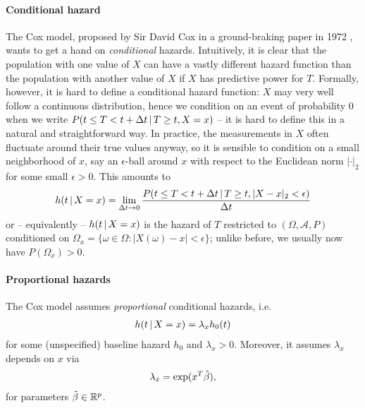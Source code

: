 \paragraph{Conditional hazard}
The Cox model, proposed by Sir David Cox in a ground-braking paper in \num{1972} \cite{cox72}, wants 
to get a hand on \textit{conditional} hazards.
Intuitively, it is clear that the population with one value of $X$ can have a vastly different 
hazard function than the population with another value of $X$ if $X$ has predictive power for $T$.
Formally, however, it is hard to define a conditional hazard function: $X$ may very well 
follow a continuous distribution, hence we condition on an event of probability $0$ when we write 
$P(t \leq T < t + \Delta t \,|\, T \geq t, X = x)$ -- it is hard to define this in a natural
and straightforward way. In practice, the measurements in $X$ often fluctuate around their true 
values anyway, so it is sensible to condition on a small neighborhood of $x$, say an $\epsilon$-ball 
around $x$ with respect to the Euclidean norm $|\cdot|_2$ for some small $\epsilon > 0$. This 
amounts to
\begin{align}
    h(t \,|\, X = x) = \lim_{\Delta t \to 0} \frac{P(t \leq T < t + \Delta t \,|\, T \geq t, 
    |X - x|_2 < \epsilon)}{\Delta t}
\end{align}
or -- equivalently -- $h(t \,|\, X = x)$ is the hazard of $T$ restricted to $(\Omega, \mathcal{A}, 
P)$ conditioned on $\Omega_x = \{ \omega \in \Omega: |X(\omega) - x| < \epsilon \}$; unlike before, 
we usually now have $P(\Omega_x) > 0$.

\paragraph{Proportional hazards} The Cox model assumes \textit{proportional} conditional hazards, 
i.e. 
\begin{align}
    h(t \,|\, X = x) = \lambda_x h_0(t) 
\end{align}
for some (unspecified) baseline hazard $h_0$ and $\lambda_x > 0$. Moreover, it assumes $\lambda_x$ depends 
on $x$ via 
\begin{align}\label{eq:cox-proportional-factor}
    \lambda_x = \exp(x^T \tilde{\beta}),
\end{align}
for parameters $\tilde{\beta} \in \mathbb{R}^p$.

